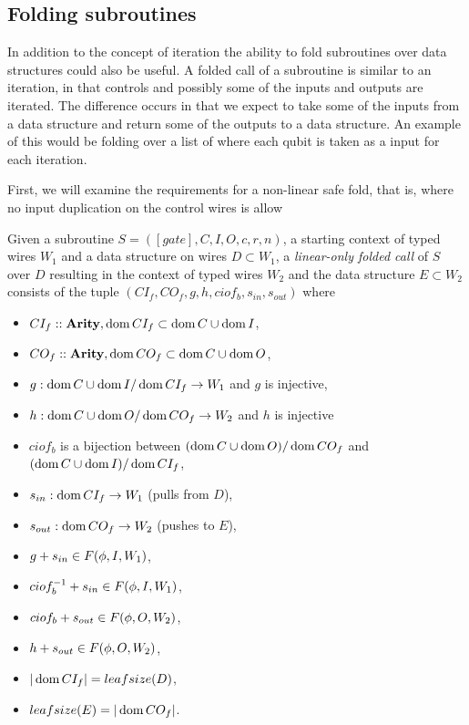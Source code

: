 \subsection{Folding subroutines} %
\label{sub:folding_subroutines}

In addition to the concept of iteration the ability to fold
subroutines over data structures could also be useful. A
folded call of a subroutine is similar to an iteration, in
that controls and possibly some of the inputs
and outputs are iterated. The difference occurs in that we
expect to take some of the inputs from a data structure and
return some of the outputs to a data structure. An example of
this would be folding over a list of  where
each qubit is taken as a input for each iteration.

First, we will examine the requirements for a non-linear
safe fold, that is, where no input duplication on the
control wires is allow



\begin{definition}\label{def:linear_only_subroutine_fold}
  Given a subroutine $S=([gate],C,I,O,c,r,n)$, a starting context of
  typed wires $W_1$ and a data structure on wires $D\subset W_1$, a
  \emph{linear-only folded call} of $S$ over $D$ resulting in the context
  of typed wires $W_2$ and the data structure $E\subset W_2$ consists of the
  tuple $(CI_f,CO_f,  g, h, ciof_b, s_{in}, s_{out})$ where
  \begin{itemize}
    \item $CI_f::\mathbf{{Arity}}, \operatorname*{dom}{CI_f} \subset \operatorname*{dom}{C}\cup \operatorname*{dom}{I}$,
    \item $CO_f::\mathbf{{Arity}}, \operatorname*{dom}{CO_f} \subset \operatorname*{dom}{C}\cup \operatorname*{dom}{O}$,
    \item $g:\operatorname*{dom}{C}\cup\operatorname*{dom} I / \operatorname*{dom}{CI_f} \to W_1$ and $g$ is injective,
    \item $h:\operatorname*{dom}{C}\cup\operatorname*{dom} O /\operatorname*{dom}{CO_f} \to W_2$ and $h$ is injective
    \item $ciof_b$ is a bijection between $(\operatorname*{dom}{C}\cup\operatorname*{dom}{O})/\operatorname*{dom}{CO_f}$
      and $(\operatorname*{dom}{C}\cup\operatorname*{dom}{I})/\operatorname*{dom}{CI_f}$,
    \item $s_{in}: \operatorname*{dom}{CI_f} \to W_1$ (pulls from $D$),
    \item $s_{out}: \operatorname*{dom}{CO_f} \to W_2$ (pushes to $E$),
    \item $g + s_{in} \in F(\phi,I,W_1)$,
    \item $ciof_b^{-1} + s_{in} \in F(\phi,I,W_1)$,
    \item $ciof_b + s_{out} \in F(\phi,O,W_2)$,
    \item $h + s_{out} \in F(\phi,O,W_2)$,
    \item $|\operatorname*{dom}{CI_f}| = leafsize(D)$,
    \item $leafsize(E) = |\operatorname*{dom}{CO_f}|$.
  \end{itemize}
\end{definition}


